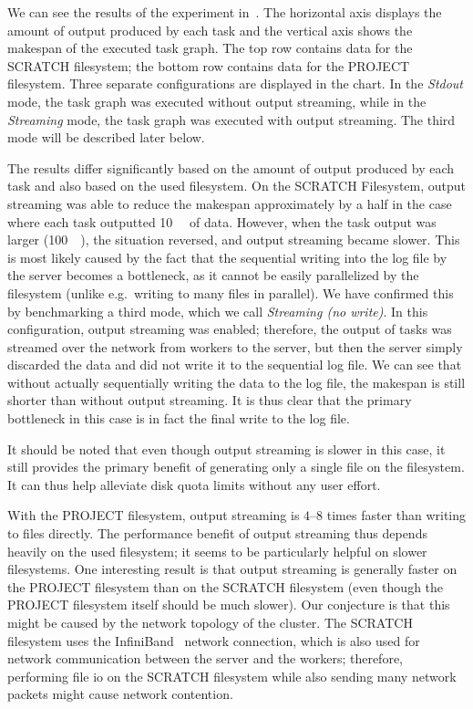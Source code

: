 We can see the results of the experiment in~. The horizontal axis displays
the amount of output produced by each task and the vertical axis shows the makespan of the executed
task graph. The top row contains data for the SCRATCH filesystem; the bottom row contains data for
the PROJECT filesystem. Three separate configurations are displayed in the chart. In the
\emph{Stdout} mode, the task graph was executed without output streaming, while in the
\emph{Streaming} mode, the task graph was executed with output streaming. The third mode
will be described later below.

The results differ significantly based on the amount of output produced by each task and also based
on the used filesystem. On the SCRATCH Filesystem, output streaming was able to reduce the makespan
approximately by a half in the case where each task outputted \SI{10}{\kibi\byte} of data.
However, when the task output was larger (\SI{100}{\kibi\byte}), the situation reversed, and
output streaming became slower. This is most likely caused by the fact that the sequential writing
into the log file by the server becomes a bottleneck, as it cannot be easily parallelized by the
filesystem (unlike e.g.\ writing to many files in parallel). We have confirmed this by benchmarking
a third mode, which we call \emph{Streaming (no write)}. In this configuration, output streaming was
enabled; therefore, the output of tasks was streamed over the network from workers to the server,
but then the server simply discarded the data and did not write it to the sequential log file. We
can see that without actually sequentially writing the data to the log file, the makespan is still
shorter than without output streaming. It is thus clear that the primary bottleneck in this case is
in fact the final write to the log file.

It should be noted that even though output streaming is slower in this case, it still provides the
primary benefit of generating only a single file on the filesystem. It can thus help alleviate disk
quota limits without any user effort.

With the PROJECT filesystem, output streaming is $4$--$8$
times faster than writing to files directly. The performance benefit of output streaming thus
depends heavily on the used filesystem; it seems to be particularly helpful on slower filesystems.
One interesting result is that output streaming is generally faster on the PROJECT filesystem than
on the SCRATCH filesystem (even though the PROJECT filesystem itself should be much slower). Our
conjecture is that this might be caused by the network topology of the cluster. The SCRATCH
filesystem uses the InfiniBand~\cite{infiniband} network connection, which is also used for
network communication between the server and the workers; therefore, performing file
\gls{io} on the SCRATCH filesystem while also sending many network packets might
cause network contention.

